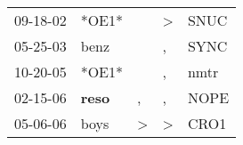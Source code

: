 \begin{supertabular}{p{0.07\textwidth}p{0.06\textwidth}p{0.02\textwidth}p{0.02\textwidth}p{0.06\textwidth}}
 09-18-02\textsuperscript{} &                            *OE1* &               &  \textgreater &  SNUC\textsuperscript{} \\
 05-25-03\textsuperscript{} &           benz\textsuperscript{} &               &             , &  SYNC\textsuperscript{} \\
 10-20-05\textsuperscript{} &                            *OE1* &               &             , &  nmtr\textsuperscript{} \\
 02-15-06\textsuperscript{} &  \textbf{reso\textsuperscript{}} &             , &             , &  NOPE\textsuperscript{} \\
 05-06-06\textsuperscript{} &           boys\textsuperscript{} &  \textgreater &  \textgreater &  CRO1\textsuperscript{} \\
\end{supertabular}
